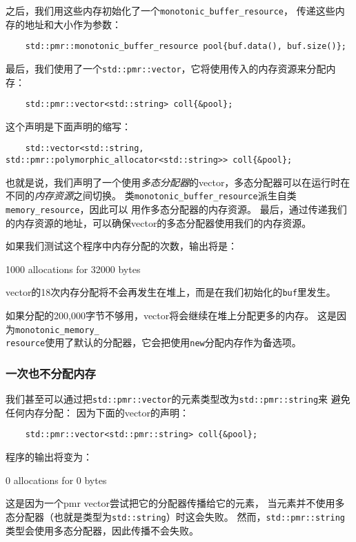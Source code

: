 之后，我们用这些内存初始化了一个\texttt{monotonic\_buffer\_resource}，
传递这些内存的地址和大小作为参数：
\begin{lstlisting}
    std::pmr::monotonic_buffer_resource pool{buf.data(), buf.size()};
\end{lstlisting}
最后，我们使用了一个\texttt{std::pmr::vector}，它将使用传入的内存资源来分配内存：
\begin{lstlisting}
    std::pmr::vector<std::string> coll{&pool};
\end{lstlisting}
这个声明是下面声明的缩写：
\begin{lstlisting}
    std::vector<std::string, std::pmr::polymorphic_allocator<std::string>> coll{&pool};
\end{lstlisting}
也就是说，我们声明了一个使用\emph{多态分配器}的vector，多态分配器可以在运行时在不同的\emph{内存资源}之间切换。
类\texttt{monotonic\_buffer\_resource}派生自类\texttt{memory\_resource}，因此可以
用作多态分配器的内存资源。
最后，通过传递我们的内存资源的地址，可以确保vector的多态分配器使用我们的内存资源。

如果我们测试这个程序中内存分配的次数，输出将是：
\begin{blacklisting}
    1000 allocations for 32000 bytes
\end{blacklisting}
vector的18次内存分配将不会再发生在堆上，而是在我们初始化的\texttt{buf}里发生。

如果分配的200,000字节不够用，vector将会继续在堆上分配更多的内存。
这是因为\texttt{monotonic\_memory\_\\
resource}使用了默认的分配器，它会把使用\texttt{new}分配内存作为备选项。

\subsubsection{一次也不分配内存}
我们甚至可以通过把\texttt{std::pmr::vector}的元素类型改为\texttt{std::pmr::string}来
避免任何内存分配：
因为下面的vector的声明：
\begin{lstlisting}
    std::pmr::vector<std::pmr::string> coll{&pool};
\end{lstlisting}
程序的输出将变为：
\begin{blacklisting}
    0 allocations for 0 bytes
\end{blacklisting}
这是因为一个pmr vector尝试把它的分配器传播给它的元素，
当元素并不使用多态分配器（也就是类型为\texttt{std::string}）时这会失败。
然而，\texttt{std::pmr::string}类型会使用多态分配器，因此传播不会失败。

